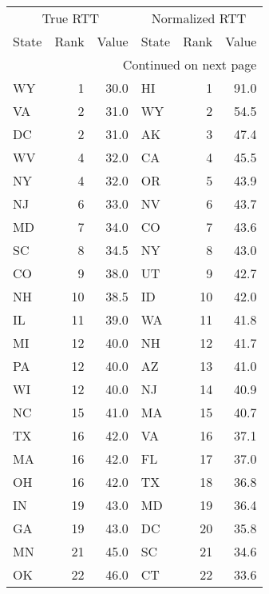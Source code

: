 \begin{longtable}{lrr||lrr}
  \multicolumn{3}{c||}{True RTT} & \multicolumn{3}{c}{Normalized RTT} \\
     State &  Rank & Value &      State & Rank & Value \\
\midrule
\endhead
\midrule
\multicolumn{6}{r}{{Continued on next page}} \\
\midrule
\endfoot
\endlastfoot
        WY &    1 &  30.0 &             HI &    1 &  91.0 \\
        VA &    2 &  31.0 &             WY &    2 &  54.5 \\
        DC &    2 &  31.0 &             AK &    3 &  47.4 \\
        WV &    4 &  32.0 &             CA &    4 &  45.5 \\
        NY &    4 &  32.0 &             OR &    5 &  43.9 \\
        NJ &    6 &  33.0 &             NV &    6 &  43.7 \\
        MD &    7 &  34.0 &             CO &    7 &  43.6 \\
        SC &    8 &  34.5 &             NY &    8 &  43.0 \\
        CO &    9 &  38.0 &             UT &    9 &  42.7 \\
        NH &   10 &  38.5 &             ID &   10 &  42.0 \\
        IL &   11 &  39.0 &             WA &   11 &  41.8 \\
        MI &   12 &  40.0 &             NH &   12 &  41.7 \\
        PA &   12 &  40.0 &             AZ &   13 &  41.0 \\
        WI &   12 &  40.0 &             NJ &   14 &  40.9 \\
        NC &   15 &  41.0 &             MA &   15 &  40.7 \\
        TX &   16 &  42.0 &             VA &   16 &  37.1 \\
        MA &   16 &  42.0 &             FL &   17 &  37.0 \\
        OH &   16 &  42.0 &             TX &   18 &  36.8 \\
        IN &   19 &  43.0 &             MD &   19 &  36.4 \\
        GA &   19 &  43.0 &             DC &   20 &  35.8 \\
        MN &   21 &  45.0 &             SC &   21 &  34.6 \\
        OK &   22 &  46.0 &             CT &   22 &  33.6 \\

\end{longtable}
